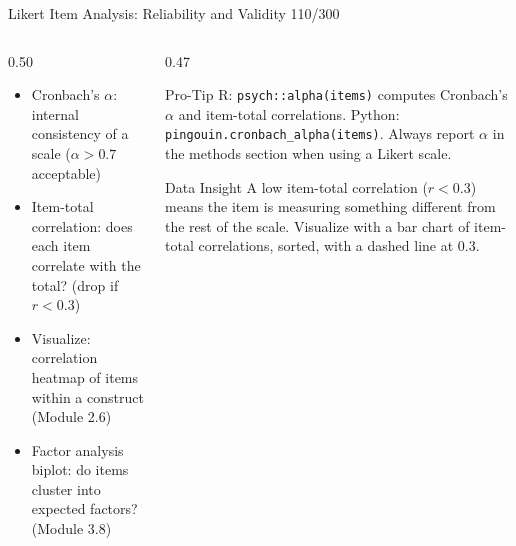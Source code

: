 \documentclass[10pt]{beamer}
\newcommand{\smark}[1]{\hfill{\scriptsize\color{codegray}#1}}
\begin{document}
\begin{frame}{Likert Item Analysis: Reliability and Validity}
\smark{110/300}
\begin{columns}[T]
\begin{column}{0.50\textwidth}
\begin{itemize}
    \item Cronbach's $\alpha$: internal consistency of a scale ($\alpha > 0.7$ acceptable)
    \item Item-total correlation: does each item correlate with the total? (drop if $r < 0.3$)
    \item Visualize: correlation heatmap of items within a construct (Module 2.6)
    \item Factor analysis biplot: do items cluster into expected factors? (Module 3.8)
\end{itemize}
\end{column}
\begin{column}{0.47\textwidth}
\begin{alertblock}{Pro-Tip}
    \scriptsize R: \texttt{psych::alpha(items)} computes Cronbach's $\alpha$ and item-total correlations. Python: \texttt{pingouin.cronbach\_alpha(items)}. Always report $\alpha$ in the methods section when using a Likert scale.
\end{alertblock}
\vspace{0.1cm}
\begin{exampleblock}{Data Insight}
    \scriptsize A low item-total correlation ($r < 0.3$) means the item is measuring something different from the rest of the scale. Visualize with a bar chart of item-total correlations, sorted, with a dashed line at 0.3.
\end{exampleblock}
\end{column}
\end{columns}
\end{frame}
\end{document}
